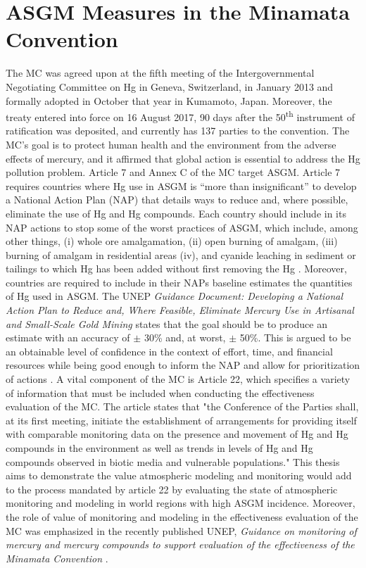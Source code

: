 \section{ASGM Measures in the Minamata Convention}
\begin{flushleft}
    

The MC was agreed upon at the fifth meeting of the Intergovernmental Negotiating Committee on Hg in Geneva, Switzerland, in January 2013 and formally adopted in October that year in Kumamoto, Japan. Moreover, the treaty entered into force on 16 August 2017, 90 days after the 50\textsuperscript{th} instrument of ratification was deposited, and currently has 137 parties to the convention\cite{unep_minamata_2013}. The MC's goal is to protect human health and the environment from the adverse effects of mercury, and it affirmed that global action is essential to address the Hg pollution problem. Article 7 and Annex C of the MC target ASGM. Article 7 requires countries where Hg use in ASGM is “more than insignificant” to develop a National Action Plan (NAP) that details ways to reduce and, where possible, eliminate the use of Hg and Hg compounds. Each country should include in its NAP actions to stop some of the worst practices of ASGM, which include, among other things, (i) whole ore amalgamation, (ii) open burning of amalgam, (iii) burning of amalgam in residential areas (iv), and cyanide leaching in sediment or tailings to which Hg has been added without first removing the Hg \cite{united_nations_environment_programme_technical_2019}.
Moreover, countries are required to include in their NAPs baseline estimates the quantities of Hg used in ASGM. The UNEP \textit{Guidance Document: Developing a National Action Plan to Reduce and, Where Feasible, Eliminate Mercury Use in Artisanal and Small-Scale Gold Mining} \cite{unep_developing_2017} states that the goal should be to produce an estimate with an accuracy of $\pm$ 30\% and, at worst, $\pm$ 50\%.  This is argued to be an obtainable level of confidence in the context of effort, time, and financial resources while being good enough to inform the NAP and allow for prioritization of actions \cite{unep_developing_2017}. A vital component of the MC is Article 22, which specifies a variety of information that must be included when conducting the effectiveness evaluation of the MC. The article states that "the Conference of the Parties shall, at its first meeting, initiate the establishment of arrangements for providing itself with comparable monitoring data on the presence and movement of Hg and Hg compounds in the environment as well as trends in levels of Hg and Hg compounds observed in biotic media and vulnerable populations." This thesis aims to demonstrate the value atmospheric modeling and monitoring would add to the process mandated by article 22 by evaluating the state of atmospheric monitoring and modeling in world regions with high ASGM incidence. Moreover, the role of value of monitoring and modeling in the effectiveness evaluation of the MC was emphasized in the recently published UNEP, \textit{Guidance on monitoring of mercury and mercury compounds to support evaluation of the effectiveness of the Minamata Convention} \cite{unep_guidance_2021}. 
\end{flushleft}

